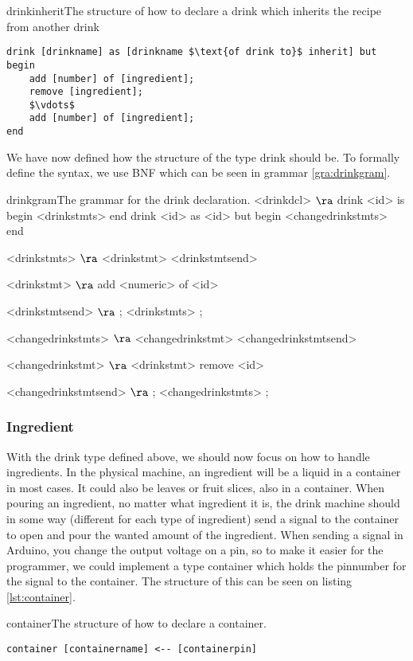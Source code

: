 \begin{code}{drinkinherit}{The structure of how to declare a drink which inherits the recipe from another drink}
\begin{lstlisting}[mathescape]
drink [drinkname] as [drinkname $\text{of drink to}$ inherit] but
begin
	add [number] of [ingredient];
	remove [ingredient];
	$\vdots$
	add [number] of [ingredient];
end
\end{lstlisting}
\end{code}

We have now defined how the structure of the type drink should be. To formally define the syntax, we use BNF which can be seen in grammar \ref{gra:drinkgram}.

\begin{grammatik}{drinkgram}{The grammar for the drink declaration.}
<drinkdcl> $\ra$ drink <id> is begin <drinkstmts> end
\alt drink <id> as <id> but begin <changedrinkstmts> end

<drinkstmts> $\ra$ <drinkstmt> <drinkstmtsend>

<drinkstmt> $\ra$ add <numeric> of <id>

<drinkstmtsend> $\ra$ ; <drinkstmts>
\alt ;

<changedrinkstmts> $\ra$ <changedrinkstmt> <changedrinkstmtsend>

<changedrinkstmt> $\ra$ <drinkstmt>
\alt remove <id>

<changedrinkstmtsend> $\ra$ ; <changedrinkstmts>
\alt ;
\end{grammatik}

\subsubsection{Ingredient}
With the drink type defined above, we should now focus on how to handle ingredients. In the physical machine, an ingredient will be a liquid in a container in most cases. It could also be leaves or fruit slices, also in a container. When pouring an ingredient, no matter what ingredient it is, the drink machine should in some way (different for each type of ingredient) send a signal to the container to open and pour the wanted amount of the ingredient. When sending a signal in Arduino, you change the output voltage on a pin, so to make it easier for the programmer, we could implement a type container which holds the pinnumber for the signal to the container. The structure of this can be seen on listing \ref{lst:container}.

\begin{code}{container}{The structure of how to declare a container.}
\begin{lstlisting}[mathescape]
container [containername] <-- [containerpin]
\end{lstlisting}
\end{code}

